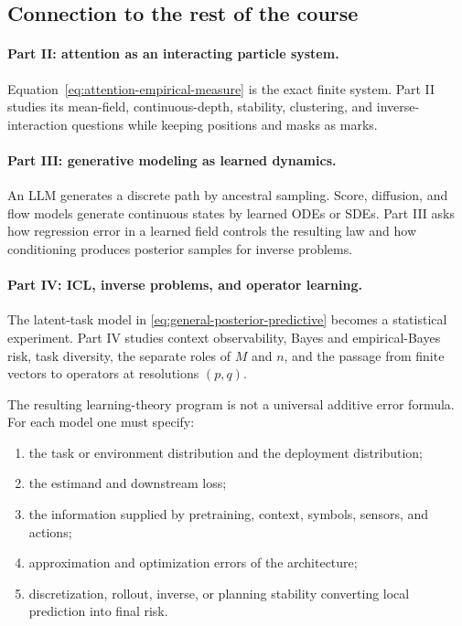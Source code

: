 \documentclass[11pt]{amsart}
\numberwithin{equation}{section}
\theoremstyle{definition}
\theoremstyle{plain}
\theoremstyle{remark}
\begin{document}
\subsection{Connection to the rest of the course}

\paragraph{\textbf{Part II: attention as an interacting particle system.}}
Equation~\eqref{eq:attention-empirical-measure} is the exact finite system.
Part II studies its mean-field, continuous-depth, stability, clustering, and
inverse-interaction questions while keeping positions and masks as marks.

\paragraph{\textbf{Part III: generative modeling as learned dynamics.}}
An LLM generates a discrete path by ancestral sampling.  Score, diffusion, and
flow models generate continuous states by learned ODEs or SDEs.  Part III asks
how regression error in a learned field controls the resulting law and how
conditioning produces posterior samples for inverse problems.

\paragraph{\textbf{Part IV: ICL, inverse problems, and operator learning.}}
The latent-task model in \eqref{eq:general-posterior-predictive} becomes a
statistical experiment.  Part IV studies context observability, Bayes and
empirical-Bayes risk, task diversity, the separate roles of $M$ and $n$, and
the passage from finite vectors to operators at resolutions $(p,q)$.

The resulting learning-theory program is not a universal additive error
formula.  For each model one must specify:
\begin{enumerate}[label=(\arabic*)]
\item the task or environment distribution and the deployment distribution;
\item the estimand and downstream loss;
\item the information supplied by pretraining, context, symbols, sensors, and
actions;
\item approximation and optimization errors of the architecture;
\item discretization, rollout, inverse, or planning stability converting local
prediction into final risk.
\end{enumerate}
\end{document}
